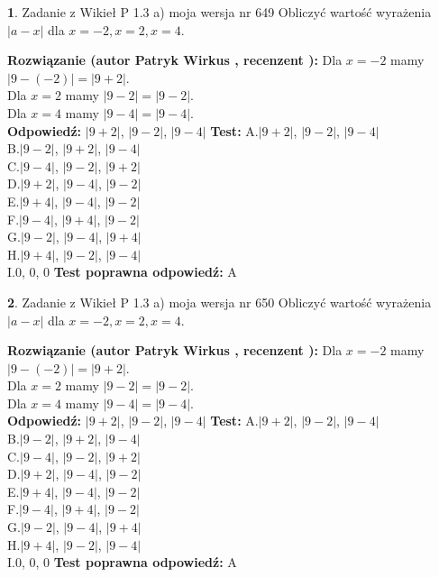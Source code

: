 \documentclass[12pt, a4paper]{article}
\theoremstyle{definition} %
\newtheorem{zad}{}
\newcommand{\zadStart}[1]{\begin{zad}#1\newline}
\newcommand{\zadStop}{\end{zad}}
\newcommand{\rozwStart}[2]{\noindent \textbf{Rozwiązanie (autor #1 , recenzent #2): }\newline}
\newcommand{\rozwStop}{\newline}
\newcommand{\odpStart}{\noindent \textbf{Odpowiedź:}\newline}
\newcommand{\odpStop}{\newline}
\newcommand{\testStart}{\noindent \textbf{Test:}\newline}
\newcommand{\testStop}{\newline}
\newcommand{\kluczStart}{\noindent \textbf{Test poprawna odpowiedź:}\newline}
\newcommand{\kluczStop}{\newline}
\begin{document}
\zadStart{Zadanie z Wikieł P 1.3 a) moja wersja nr 649}
Obliczyć wartość wyrażenia $|a - x|$ dla $x=-2,x=2,x=4$.
\zadStop
\rozwStart{Patryk Wirkus}{}
Dla $x = -2$ mamy $|9 - (-2)| = |9 + 2|$.\\
Dla $x = 2$ mamy $|9 - 2| = |9 - 2|$.\\
Dla $x = 4$ mamy $|9 - 4| = |9 - 4|$.\\
\rozwStop
\odpStart
$|9 + 2|$, $|9 - 2|$, $|9 - 4|$
\odpStop
\testStart
A.$|9 + 2|$, $|9 - 2|$, $|9 - 4|$\\
B.$|9 - 2|$, $|9 + 2|$, $|9 - 4|$\\
C.$|9 - 4|$, $|9 - 2|$, $|9 + 2|$\\
D.$|9 + 2|$, $|9 - 4|$, $|9 - 2|$\\
E.$|9 + 4|$, $|9 - 4|$, $|9 - 2|$\\
F.$|9 - 4|$, $|9 + 4|$, $|9 - 2|$\\
G.$|9 - 2|$, $|9 - 4|$, $|9 + 4|$\\
H.$|9 + 4|$, $|9 - 2|$, $|9 - 4|$\\
I.$0$, $0$, $0$
\testStop
\kluczStart
A
\kluczStop



\zadStart{Zadanie z Wikieł P 1.3 a) moja wersja nr 650}
Obliczyć wartość wyrażenia $|a - x|$ dla $x=-2,x=2,x=4$.
\zadStop
\rozwStart{Patryk Wirkus}{}
Dla $x = -2$ mamy $|9 - (-2)| = |9 + 2|$.\\
Dla $x = 2$ mamy $|9 - 2| = |9 - 2|$.\\
Dla $x = 4$ mamy $|9 - 4| = |9 - 4|$.\\
\rozwStop
\odpStart
$|9 + 2|$, $|9 - 2|$, $|9 - 4|$
\odpStop
\testStart
A.$|9 + 2|$, $|9 - 2|$, $|9 - 4|$\\
B.$|9 - 2|$, $|9 + 2|$, $|9 - 4|$\\
C.$|9 - 4|$, $|9 - 2|$, $|9 + 2|$\\
D.$|9 + 2|$, $|9 - 4|$, $|9 - 2|$\\
E.$|9 + 4|$, $|9 - 4|$, $|9 - 2|$\\
F.$|9 - 4|$, $|9 + 4|$, $|9 - 2|$\\
G.$|9 - 2|$, $|9 - 4|$, $|9 + 4|$\\
H.$|9 + 4|$, $|9 - 2|$, $|9 - 4|$\\
I.$0$, $0$, $0$
\testStop
\kluczStart
A
\kluczStop
\end{document}
